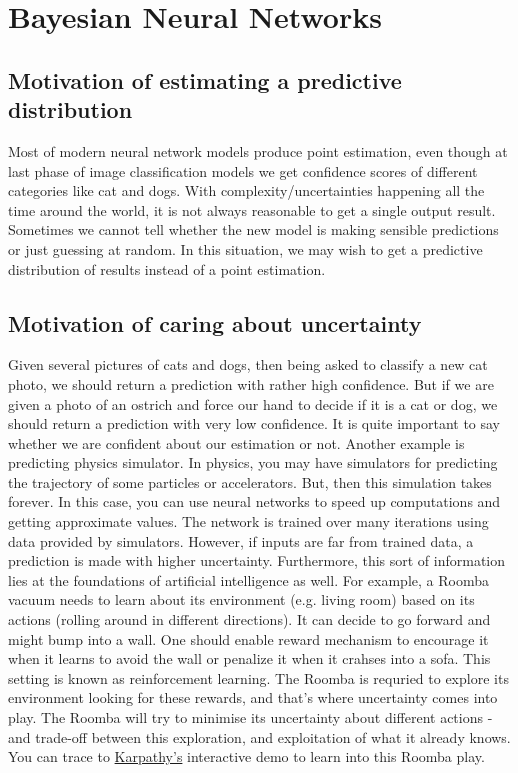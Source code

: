 \chapter{Bayesian Neural Networks}

\section{ Motivation of estimating a predictive distribution }

Most of modern neural network models produce point estimation, even though at last phase of image classification models we get confidence scores of different categories like cat and dogs. With complexity/uncertainties happening all the time around the world, it is not always reasonable to get a single output result. Sometimes we cannot tell whether the new model is making sensible predictions or just guessing at random. In this situation, we may wish to get a predictive distribution of results instead of a point estimation.\\

\section{Motivation of caring about uncertainty}

Given several pictures of cats and dogs, then being asked to classify a new cat photo, we should return a prediction with rather high confidence. But if we are given a photo of an ostrich and force our hand to decide if it is a cat or dog, we should return a prediction with very low confidence. It is quite important to say whether we are confident about our estimation or not. Another example is predicting physics simulator. In physics, you may have simulators for predicting the trajectory of some particles or accelerators. But, then this simulation takes forever. In this case, you can use neural networks to speed up computations and getting approximate values. The network is trained over many iterations using data provided by simulators. However, if inputs are far from trained data, a prediction is made with higher uncertainty. Furthermore, this sort of information lies at the foundations of artificial intelligence as well. For example, a Roomba vacuum needs to learn about its environment (e.g. living room) based on its actions (rolling around in different directions). It can decide to go forward and might bump into a wall. One should enable reward mechanism to encourage it when it learns to avoid the wall or penalize it when it crahses into a sofa. This setting is known as reinforcement learning. The Roomba is requried to explore its environment looking for these rewards, and that's where uncertainty comes into play. The Roomba will try to minimise its uncertainty about different actions - and trade-off between this exploration, and exploitation of what it already knows. You can trace to \href{https://cs.stanford.edu/people/karpathy/convnetjs/demo/rldemo.html}{Karpathy's} interactive demo to learn into this Roomba play. 

